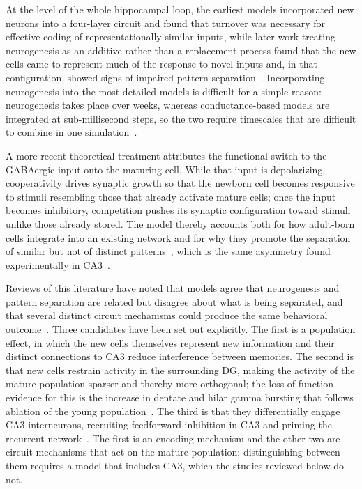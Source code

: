 At the level of the whole hippocampal loop, the earliest models incorporated new neurons into a four-layer circuit and found that
turnover was necessary for effective coding of representationally similar inputs, while later work treating neurogenesis as an
additive rather than a replacement process found that the new cells came to represent much of the response to novel inputs and, in
that configuration, showed signs of impaired pattern separation~\parencite{aimoneComputational2016}. Incorporating neurogenesis into
the most detailed models is difficult for a simple reason: neurogenesis takes place over weeks, whereas conductance-based
models are integrated at sub-millisecond steps, so the two require timescales that are difficult to combine in one
simulation~\parencite{aimoneComputational2016}.

A more recent theoretical treatment attributes the functional switch to the GABAergic input onto the maturing cell. While that
input is depolarizing, cooperativity drives synaptic growth so that the newborn cell becomes responsive to stimuli resembling
those that already activate mature cells; once the input becomes inhibitory, competition pushes its synaptic configuration toward
stimuli unlike those already stored. The model thereby accounts both for how adult-born cells integrate into an existing network
and for why they promote the separation of similar but not of distinct patterns~\parencite{gozelFunctional2021}, which is the same
asymmetry found experimentally in CA3~\parencite{niiboriSuppression2012}.

Reviews of this literature have noted that models agree that neurogenesis and pattern separation are related but disagree about
what is being separated, and that several distinct circuit mechanisms could produce the same behavioral
outcome~\parencite{aimoneComputational2016, wangEffect2024}. Three candidates have been set out explicitly. The first is a
population effect, in which the new cells themselves represent new information and their distinct connections to CA3 reduce
interference between memories. The second is that new cells restrain activity in the surrounding DG, making the activity of the
mature population sparser and thereby more orthogonal; the loss-of-function evidence for this is the increase in dentate and hilar
gamma bursting that follows ablation of the young population~\parencite{lacefieldEffects2012}. The third is that they
differentially engage CA3 interneurons, recruiting feedforward inhibition in CA3 and priming the recurrent
network~\parencite{aimoneComputational2016}. The first is an encoding mechanism and the other two are circuit mechanisms that act
on the mature population; distinguishing between them requires a model that includes CA3, which the studies reviewed below do not.

